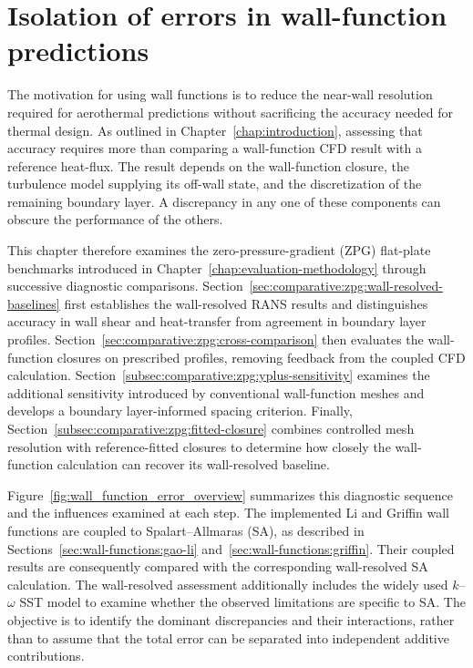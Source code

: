 \chapter{Isolation of errors in wall-function predictions}
\label{chap:comparative-evaluation} 

The motivation for using wall functions is to reduce the near-wall resolution required for aerothermal predictions without sacrificing the accuracy needed for thermal design. As outlined in Chapter~\ref{chap:introduction}, assessing that accuracy requires more than comparing a wall-function CFD result with a reference heat-flux. The result depends on the wall-function closure, the turbulence model supplying its off-wall state, and the discretization of the remaining boundary layer. A discrepancy in any one of these components can obscure the performance of the others.
\par\medskip

This chapter therefore examines the zero-pressure-gradient (ZPG) flat-plate benchmarks introduced in Chapter~\ref{chap:evaluation-methodology} through successive diagnostic comparisons. Section~\ref{sec:comparative:zpg:wall-resolved-baselines} first establishes the wall-resolved RANS results and distinguishes accuracy in wall shear and heat-transfer from agreement in boundary layer profiles. Section~\ref{sec:comparative:zpg:cross-comparison} then evaluates the wall-function closures on prescribed profiles, removing feedback from the coupled CFD calculation. Section~\ref{subsec:comparative:zpg:yplus-sensitivity} examines the additional sensitivity introduced by conventional wall-function meshes and develops a boundary layer-informed spacing criterion. Finally, Section~\ref{subsec:comparative:zpg:fitted-closure} combines controlled mesh resolution with reference-fitted closures to determine how closely the wall-function calculation can recover its wall-resolved baseline.
\par\medskip

Figure~\ref{fig:wall_function_error_overview} summarizes this diagnostic sequence and the influences examined at each step. The implemented Li and Griffin wall functions are coupled to Spalart--Allmaras (SA), as described in Sections~\ref{sec:wall-functions:gao-li} and~\ref{sec:wall-functions:griffin}. Their coupled results are consequently compared with the corresponding wall-resolved SA calculation. The wall-resolved assessment additionally includes the widely used \(k\)--\(\omega\) SST model to examine whether the observed limitations are specific to SA. The objective is to identify the dominant discrepancies and their interactions, rather than to assume that the total error can be separated into independent additive contributions.

